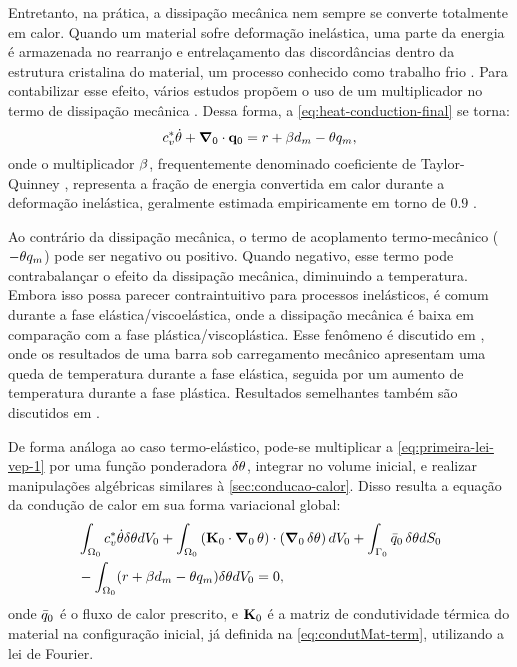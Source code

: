 \documentclass[Tese.tex]{subfiles}
\begin{document}
Entretanto, na prática, a dissipação mecânica nem sempre se converte totalmente em calor. Quando um material sofre deformação inelástica, uma parte da energia é armazenada no rearranjo e entrelaçamento das discordâncias dentro da estrutura cristalina do material, um processo conhecido como trabalho frio \cite{KAMLAH1997893, BENZERGA20054765}. Para contabilizar esse efeito, vários estudos propõem o uso de um multiplicador no termo de dissipação mecânica \cite{LEE1969, Allen1991}. Dessa forma, a \cref{eq:heat-conduction-final} se torna:
\begin{equation}\label{eq:heat-conduction-final}
c_v^{*}\dot{\theta} + \boldsymbol{\nabla}_0\cdot\mathbf{q}_0 = r + \beta d_{m} - \theta q_m,
\end{equation}
onde o multiplicador $\beta$, frequentemente denominado coeficiente de Taylor-Quinney \cite{TaylorQuinney1934, BENAARBIA2019105128}, representa a fração de energia convertida em calor durante a deformação inelástica, geralmente estimada empiricamente em torno de $0.9$ \cite{LEE1969, LEE2001187}.

Ao contrário da dissipação mecânica, o termo de acoplamento termo-mecânico ($-\theta q_m$) pode ser negativo ou positivo. Quando negativo, esse termo pode contrabalançar o efeito da dissipação mecânica, diminuindo a temperatura. Embora isso possa parecer contraintuitivo para processos inelásticos, é comum durante a fase elástica/viscoelástica, onde a dissipação mecânica é baixa em comparação com a fase plástica/viscoplástica. Esse fenômeno é discutido em \cite{hsu2012finite}, onde os resultados de uma barra sob carregamento mecânico apresentam uma queda de temperatura durante a fase elástica, seguida por um aumento de temperatura durante a fase plástica. Resultados semelhantes também são discutidos em \cite{Allen1991}.


De forma análoga ao caso termo-elástico, pode-se multiplicar a \cref{eq:primeira-lei-vep-1} por uma função ponderadora $\delta\theta$, integrar no volume inicial, e realizar manipulações algébricas similares à \autoref{sec:conducao-calor}. Disso resulta a equação da condução de calor em sua forma variacional global:
\begin{equation}\label{eq:equacao-conducao-global-fourier-tvep}
	\begin{aligned}
		&\int_{\Omega_0}c_v^{*}\dot{\theta}\delta\theta dV_0 + \int_{\Omega_0}\left(\mathbf{K}_0\cdot\boldsymbol{\nabla}_0\,\theta\right)\cdot\left(\boldsymbol{\nabla}_0\,\delta\theta\right) dV_0 + \int_{\Gamma_0}\bar{q}_0\,\delta\theta dS_0 \\&- \int_{\Omega_0}(r + \beta d_{m} - \theta q_m)\delta\theta dV_0 = 0,
	\end{aligned}
\end{equation}
onde $\bar{q}_0$ é o fluxo de calor prescrito, e $\mathbf{K}_0$ é a matriz de condutividade térmica do material na configuração inicial, já definida na \cref{eq:condutMat-term}, utilizando a lei de Fourier.
\end{document}
